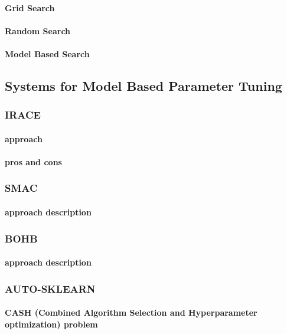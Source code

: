 \paragraph{Grid Search}
\paragraph{Random Search}
\paragraph{Model Based Search}

\subsection{Systems for Model Based Parameter Tuning}\label{bg: parameter tuning expamples}

\subsubsection{IRACE}
\paragraph{approach} \cite{irace:lopez2016irace}
\paragraph{pros and cons}

\subsubsection{SMAC}
\paragraph{approach description}

\subsubsection{BOHB}
\paragraph{approach description}

\subsubsection{AUTO-SKLEARN}
\paragraph{CASH (Combined Algorithm Selection and Hyperparameter optimization) problem}
